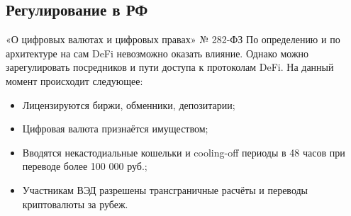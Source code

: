 \documentclass[aspectratio=169]{beamer}
\begin{document}
\subsection{Регулирование в РФ}
\begin{frame}{«О цифровых валютах и цифровых правах» № 282-ФЗ}
  По определению и по архитектуре на сам DeFi невозможно оказать влияние. Однако можно зарегулировать посредников и пути доступа к протоколам DeFi. На данный момент происходит следующее:
  \begin{itemize}
    \item Лицензируются биржи, обменники, депозитарии;
    \item Цифровая валюта признаётся имуществом;
    \item Вводятся некастодиальные кошельки и cooling-off периоды в 48 часов при переводе более 100 000 руб.;
    \item Участникам ВЭД разрешены трансграничные расчёты и переводы криптовалюты за рубеж.
  \end{itemize}
\end{frame}
\end{document}
